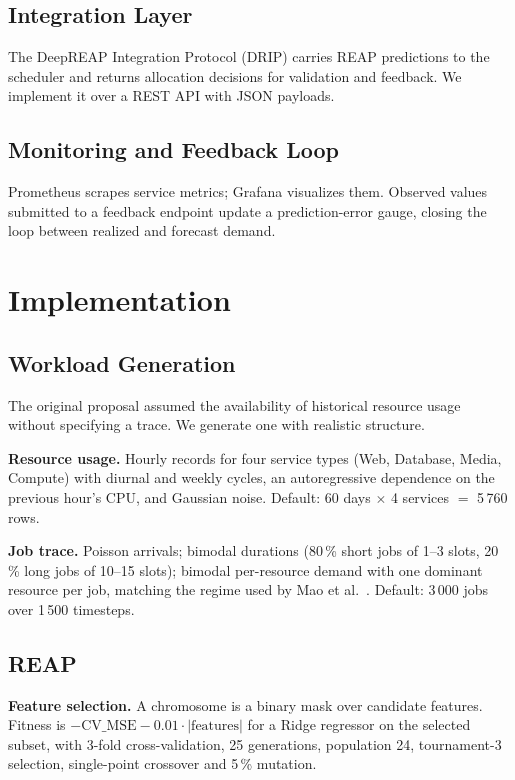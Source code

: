 \documentclass[runningheads]{llncs}
\begin{document}
\subsection{Integration Layer}

The DeepREAP Integration Protocol (DRIP) carries REAP predictions to
the scheduler and returns allocation decisions for validation and
feedback. We implement it over a REST API with JSON payloads.

\subsection{Monitoring and Feedback Loop}

Prometheus scrapes service metrics; Grafana visualizes them. Observed
values submitted to a feedback endpoint update a prediction-error
gauge, closing the loop between realized and forecast demand.

\section{Implementation}

\subsection{Workload Generation}

The original proposal assumed the availability of historical resource
usage without specifying a trace. We generate one with realistic
structure.

\textbf{Resource usage.} Hourly records for four service types (Web,
Database, Media, Compute) with diurnal and weekly cycles, an
autoregressive dependence on the previous hour's CPU, and Gaussian
noise. Default: 60 days $\times$ 4 services $=$ 5\,760 rows.

\textbf{Job trace.} Poisson arrivals; bimodal durations (80\,\% short
jobs of 1--3 slots, 20\,\% long jobs of 10--15 slots); bimodal
per-resource demand with one dominant resource per job, matching the
regime used by Mao et al.~\cite{mao2016}. Default: 3\,000 jobs over
1\,500 timesteps.

\subsection{REAP}

\textbf{Feature selection.} A chromosome is a binary mask over
candidate features. Fitness is
$-\mathrm{CV\_MSE} - 0.01 \cdot |\text{features}|$
for a Ridge regressor on the selected subset, with 3-fold
cross-validation, 25 generations, population 24, tournament-3
selection, single-point crossover and 5\,\% mutation.
\end{document}
